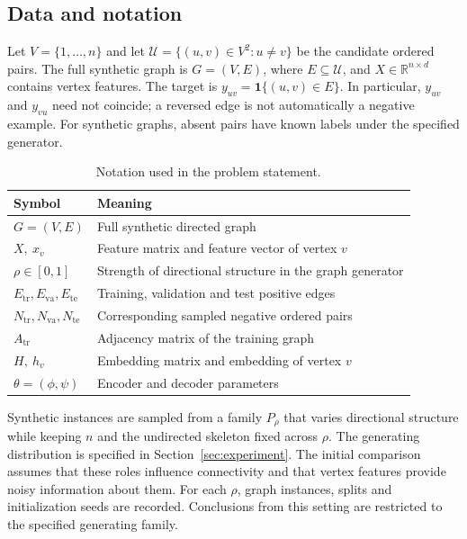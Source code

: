 \documentclass{article}
\begin{document}
\subsection{Data and notation}
Let $V=\{1,\ldots,n\}$ and let $\mathcal U=\{(u,v)\in V^2:u\ne v\}$ be the candidate ordered pairs.
The full synthetic graph is $G=(V,E)$, where $E\subseteq\mathcal U$, and $X\in\mathbb R^{n\times d}$ contains vertex features.
The target is $y_{uv}=\mathbf 1\{(u,v)\in E\}$.
In particular, $y_{uv}$ and $y_{vu}$ need not coincide; a reversed edge is not automatically a negative example.
For synthetic graphs, absent pairs have known labels under the specified generator.

\begin{table}[H]
\centering
\small
\caption{Notation used in the problem statement.}
\label{tab:notation}
\begin{tabular}{ll}
\toprule
Symbol & Meaning \\
\midrule
$G=(V,E)$ & Full synthetic directed graph \\
$X,\ x_v$ & Feature matrix and feature vector of vertex $v$ \\
$\rho\in[0,1]$ & Strength of directional structure in the graph generator \\
$E_{\mathrm{tr}},E_{\mathrm{va}},E_{\mathrm{te}}$ & Training, validation and test positive edges \\
$N_{\mathrm{tr}},N_{\mathrm{va}},N_{\mathrm{te}}$ & Corresponding sampled negative ordered pairs \\
$A_{\mathrm{tr}}$ & Adjacency matrix of the training graph \\
$H,\ h_v$ & Embedding matrix and embedding of vertex $v$ \\
$\theta=(\phi,\psi)$ & Encoder and decoder parameters \\
\bottomrule
\end{tabular}
\end{table}

Synthetic instances are sampled from a family $P_\rho$ that varies directional structure while keeping $n$ and the undirected skeleton fixed across $\rho$.
The generating distribution is specified in Section~\ref{sec:experiment}.
The initial comparison assumes that these roles influence connectivity and that vertex features provide noisy information about them.
For each $\rho$, graph instances, splits and initialization seeds are recorded.
Conclusions from this setting are restricted to the specified generating family.
\end{document}
